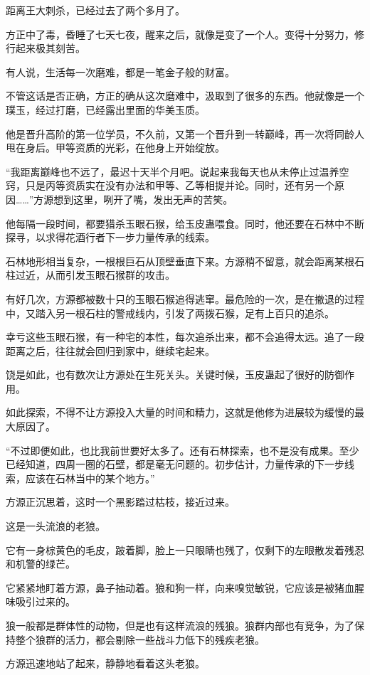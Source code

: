 \begin{this_body}
距离王大刺杀，已经过去了两个多月了。

方正中了毒，昏睡了七天七夜，醒来之后，就像是变了一个人。变得十分努力，修行起来极其刻苦。

有人说，生活每一次磨难，都是一笔金子般的财富。

不管这话是否正确，方正的确从这次磨难中，汲取到了很多的东西。他就像是一个璞玉，经过打磨，已经露出里面的华美玉质。

他是晋升高阶的第一位学员，不久前，又第一个晋升到一转巅峰，再一次将同龄人甩在身后。甲等资质的光彩，在他身上开始绽放。

“我距离巅峰也不远了，最迟十天半个月吧。说起来我每天也从未停止过温养空窍，只是丙等资质实在没有办法和甲等、乙等相提并论。同时，还有另一个原因……”方源想到这里，咧开了嘴，发出无声的苦笑。

他每隔一段时间，都要猎杀玉眼石猴，给玉皮蛊喂食。同时，他还要在石林中不断探寻，以求得花酒行者下一步力量传承的线索。

石林地形相当复杂，一根根巨石从顶壁垂直下来。方源稍不留意，就会距离某根石柱过近，从而引发玉眼石猴群的攻击。

有好几次，方源都被数十只的玉眼石猴追得逃窜。最危险的一次，是在撤退的过程中，又踏入另一根石柱的警戒线内，引发了两拨石猴，足有上百只的追杀。

幸亏这些玉眼石猴，有一种宅的本性，每次追杀出来，都不会追得太远。追了一段距离之后，往往就会回归到家中，继续宅起来。

饶是如此，也有数次让方源处在生死关头。关键时候，玉皮蛊起了很好的防御作用。

如此探索，不得不让方源投入大量的时间和精力，这就是他修为进展较为缓慢的最大原因了。

“不过即便如此，也比我前世要好太多了。还有石林探索，也不是没有成果。至少已经知道，四周一圈的石壁，都是毫无问题的。初步估计，力量传承的下一步线索，应该在石林当中的某个地方。”

方源正沉思着，这时一个黑影踏过枯枝，接近过来。

这是一头流浪的老狼。

它有一身棕黄色的毛皮，跛着脚，脸上一只眼睛也残了，仅剩下的左眼散发着残忍和机警的绿芒。

它紧紧地盯着方源，鼻子抽动着。狼和狗一样，向来嗅觉敏锐，它应该是被猪血腥味吸引过来的。

狼一般都是群体性的动物，但是也有这样流浪的残狼。狼群内部也有竞争，为了保持整个狼群的活力，都会剔除一些战斗力低下的残疾老狼。

方源迅速地站了起来，静静地看着这头老狼。


\end{this_body}
